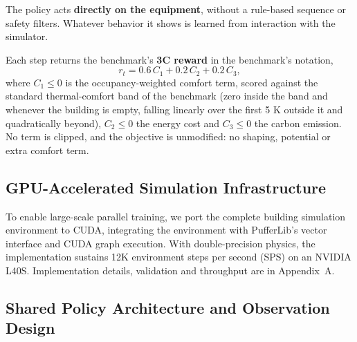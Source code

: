 \documentclass{article}
\begin{document}
The policy acts \textbf{directly on the equipment}, without a rule-based sequence or safety filters. Whatever behavior it shows is learned from interaction with the simulator.

{\samepage
Each step returns the benchmark's \textbf{3C reward} in the benchmark's notation,
\[
r_t = 0.6\,C_1 + 0.2\,C_2 + 0.2\,C_3,
\]
where $C_1 \le 0$ is the occupancy-weighted comfort term, scored against the standard thermal-comfort band of the benchmark \citep{ashrae55} (zero inside the band and whenever the building is empty, falling linearly over the first 5 K outside it and quadratically beyond), $C_2 \le 0$ the energy cost and $C_3 \le 0$ the carbon emission. No term is clipped, and the objective is unmodified: no shaping, potential or extra comfort term.
}


\subsection{GPU-Accelerated Simulation Infrastructure}

To enable large-scale parallel training, we port the complete building simulation environment to CUDA, integrating the environment with PufferLib's vector interface \citep{suarez2024pufferlib} and CUDA graph execution. With double-precision physics, the implementation sustains 12K environment steps per second (SPS) on an NVIDIA L40S. Implementation details, validation and throughput are in Appendix~A.

\subsection{Shared Policy Architecture and Observation Design}
\end{document}
